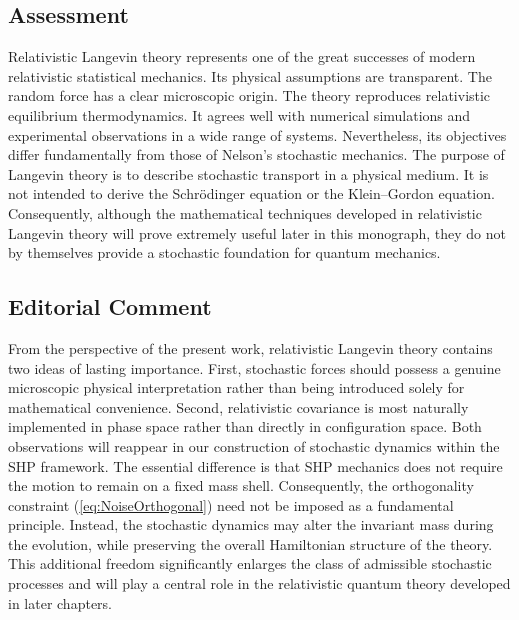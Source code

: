 \subsection{Assessment}
Relativistic Langevin theory represents one of the great successes of
modern relativistic statistical mechanics.
Its physical assumptions are transparent.
The random force has a clear microscopic origin.
The theory reproduces relativistic equilibrium thermodynamics.
It agrees well with numerical simulations and experimental
observations in a wide range of systems.
Nevertheless,
its objectives differ fundamentally from those of Nelson's stochastic
mechanics.
The purpose of Langevin theory is to describe stochastic transport in a
physical medium.
It is not intended to derive the Schrödinger equation or the
Klein--Gordon equation.
Consequently,
although the mathematical techniques developed in relativistic Langevin
theory will prove extremely useful later in this monograph,
they do not by themselves provide a stochastic foundation for quantum
mechanics.
\subsection*{Editorial Comment}
From the perspective of the present work, relativistic Langevin theory
contains two ideas of lasting importance.
First, stochastic forces should possess a genuine microscopic physical
interpretation rather than being introduced solely for mathematical
convenience.
Second, relativistic covariance is most naturally implemented in phase
space rather than directly in configuration space.
Both observations will reappear in our construction of stochastic
dynamics within the SHP framework.
The essential difference is that SHP mechanics does not require the
motion to remain on a fixed mass shell.
Consequently, the orthogonality constraint
(\ref{eq:NoiseOrthogonal})
need not be imposed as a fundamental principle.
Instead, the stochastic dynamics may alter the invariant mass during the
evolution, while preserving the overall Hamiltonian structure of the
theory.
This additional freedom significantly enlarges the class of admissible
stochastic processes and will play a central role in the relativistic
quantum theory developed in later chapters.
